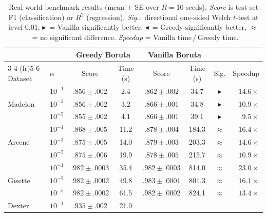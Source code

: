 \documentclass[runningheads]{llncs}
\begin{document}
\begin{table}[H]
\caption{Real-world benchmark results (mean $\pm$ SE over $R=10$ seeds).
\emph{Score} is test-set F1 (classification) or $R^2$ (regression).
\emph{Sig.}:\ directional one-sided Welch $t$-test at level $0.01$;
$\blacktriangleright$~= Vanilla significantly better,
$\blacktriangleleft$~= Greedy significantly better,
$\approx$~= no significant difference.
\emph{Speedup} = Vanilla time\,/\,Greedy time.}
\label{tab:realworld_results}
\centering
\small
\begin{tabular}{ll cc cc c r}
\toprule
& & \multicolumn{2}{c}{Greedy Boruta}
& \multicolumn{2}{c}{Vanilla Boruta} & & \\
\cmidrule(lr){3-4} \cmidrule(lr){5-6}
Dataset & $\alpha$ & Score & Time (s)
                   & Score & Time (s)
                   & Sig. & Speedup \\
\midrule
\multirow{3}{*}{Madelon}
  & $10^{-1}$  & $.856 \pm .002$ & 2.4
               & $.862 \pm .002$ & 34.7
               & $\blacktriangleright$ & $14.6\times$ \\
  & $10^{-3}$  & $.856 \pm .002$ & 3.2
               & $.866 \pm .001$ & 34.8
               & $\blacktriangleright$ & $10.9\times$ \\
  & $10^{-5}$  & $.855 \pm .002$ & 4.1
               & $.866 \pm .001$ & 39.1
               & $\blacktriangleright$ & $9.5\times$ \\
\midrule
\multirow{3}{*}{Arcene}
  & $10^{-1}$  & $.868 \pm .005$ & 11.2
               & $.878 \pm .004$ & 184.3
               & $\approx$ & $16.4\times$ \\
  & $10^{-3}$  & $.875 \pm .005$ & 14.0
               & $.879 \pm .003$ & 203.3
               & $\approx$ & $14.6\times$ \\
  & $10^{-5}$  & $.875 \pm .006$ & 19.9
               & $.878 \pm .005$ & 215.7
               & $\approx$ & $10.9\times$ \\
\midrule
\multirow{3}{*}{Gisette}
  & $10^{-1}$  & $.982 \pm .0003$ & 35.4
               & $.982 \pm .0003$ & 814.0
               & $\approx$ & $23.0\times$ \\
  & $10^{-3}$  & $.982 \pm .0002$ & 49.8
               & $.983 \pm .0001$ & 801.3
               & $\approx$ & $16.1\times$ \\
  & $10^{-5}$  & $.982 \pm .0002$ & 61.5
               & $.982 \pm .0002$ & 824.1
               & $\approx$ & $13.4\times$ \\
\midrule
\multirow{3}{*}{Dexter}
  & $10^{-1}$  & $.935 \pm .002$ & 21.0

\end{tabular}
\end{table}
\end{document}
